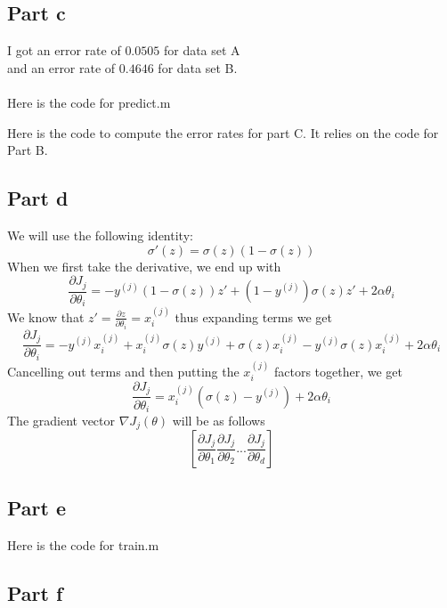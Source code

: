 \documentclass[twoside,11pt]{article}
\theoremstyle{definition}
\begin{document}
\subsection*{Part c}

I got an error rate of $0.0505$ for data set A\\
 and an error rate of $0.4646$ for data set B.\\
\\
Here is the code for predict.m

\newpage
Here is the code to compute the error rates for part C. It relies on the code for Part B.


\subsection*{Part d}

We will use the following identity:
\[
\sigma'(z) = \sigma(z)(1-\sigma(z))
\]
When we first take the derivative, we end up with
\[
\frac{\partial J_j}{\partial \theta_i} = -y^{(j)} (1-\sigma(z)) z' + (1-y^{(j)}) \sigma(z) z' + 2 \alpha \theta_i
\]
We know that $z' = \frac{\partial z}{\partial \theta_i}= x_i^{(j)}$ thus expanding terms we get
\[
\frac{\partial J_j}{\partial \theta_i} = -y^{(j)}x_i^{(j)} + x_i^{(j)}\sigma(z)y^{(j)} + \sigma(z) x_i^{(j)} -y^{(j)} \sigma(z) x_i^{(j)} + 2 \alpha \theta_i
\]
Cancelling out terms and then putting the $x_i^{(j)}$ factors together, we get
\[
\frac{\partial J_j}{\partial \theta_i} = x_i^{(j)} (\sigma(z) - y^{(j)} ) + 2 \alpha \theta_i
\]
The gradient vector $\nabla J_j(\theta)$ will be as follows
\[
[\frac{\partial J_j}{\partial \theta_1} \frac{\partial J_j}{\partial \theta_2} ... \frac{\partial J_j}{\partial \theta_d}]
\]
\newpage
\subsection*{Part e}

Here is the code for train.m


\newpage

\subsection*{Part f}
\end{document}
